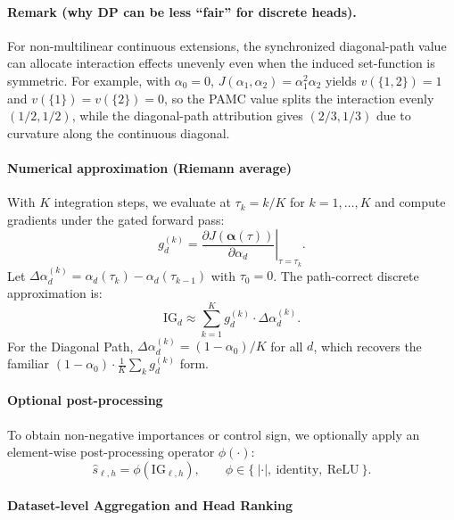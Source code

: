 \paragraph{Remark (why DP can be less ``fair'' for discrete heads).}
For non-multilinear continuous extensions, the synchronized diagonal-path value can allocate interaction effects unevenly even when the induced set-function is symmetric. For example, with $\alpha_0=0$, $J(\alpha_1,\alpha_2)=\alpha_1^2\alpha_2$ yields $v(\{1,2\})=1$ and $v(\{1\})=v(\{2\})=0$, so the PAMC value splits the interaction evenly $(1/2,1/2)$, while the diagonal-path attribution gives $(2/3,1/3)$ due to curvature along the continuous diagonal.

\paragraph*{Numerical approximation (Riemann average)}
\label{sec:method:ig_approx}

With $K$ integration steps, we evaluate at $\tau_k = k/K$ for $k=1,\dots,K$ and compute gradients under the gated forward pass:
\begin{equation}
g_{d}^{(k)} = \left.\frac{\partial J(\boldsymbol{\alpha}(\tau))}{\partial \alpha_{d}}\right|_{\tau=\tau_k}.
\end{equation}
Let $\Delta \alpha_d^{(k)} = \alpha_d(\tau_k)-\alpha_d(\tau_{k-1})$ with $\tau_0=0$. The path-correct discrete approximation is:
\begin{equation}
\mathrm{IG}_{d}
\approx
\sum_{k=1}^{K} g_{d}^{(k)} \cdot \Delta \alpha_d^{(k)}.
\label{eq:ig_gate}
\end{equation}
For the Diagonal Path, $\Delta \alpha_d^{(k)}=(1-\alpha_0)/K$ for all $d$, which recovers the familiar $(1-\alpha_0)\cdot \frac{1}{K}\sum_k g_d^{(k)}$ form.

\paragraph*{Optional post-processing}
\label{sec:method:postprocess}

To obtain non-negative importances or control sign, we optionally apply an element-wise post-processing operator $\phi(\cdot)$:
\begin{equation}
\hat{s}_{\ell,h} = \phi(\mathrm{IG}_{\ell,h}),
\qquad
\phi \in \{\ |\cdot|,\ \mathrm{identity},\ \mathrm{ReLU}\ \}.
\end{equation}

\paragraph*{Dataset-level Aggregation and Head Ranking}
\label{sec:method:aggregation}

